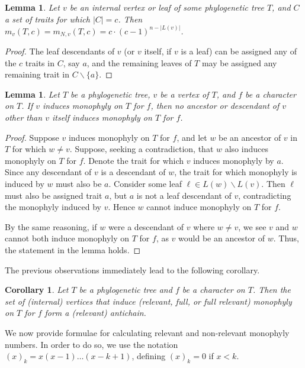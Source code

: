 \documentclass{amsart}
\newtheorem{lemma}[theorem]{Lemma}
\newtheorem{corollary}[theorem]{Corollary}
\theoremstyle{definition}
\begin{document}
\begin{lemma}
\label{l:single.v.count}
    Let $v$ be an internal vertex or leaf of some phylogenetic tree $T$, and $C$ a set of traits for which $|C|=c$. Then $m_v(T,c)= m_{N,v}(T,c) = c \cdot (c-1)^{n-|L(v)|} $.
\end{lemma}

\begin{proof}
    The leaf descendants of $v$ (or $v$ itself, if $v$ is a leaf) can be assigned any of the $c$ traits in $C$, say $a$, and the remaining leaves of $T$ may be assigned any remaining trait in $C \backslash\{a\}$. 
\end{proof}

\begin{lemma}\label{lem_ancdes}
    Let $T$ be a phylogenetic tree, $v$ be a vertex of $T$, and $f$ be a character on $T$. If $v$ induces monophyly on $T$ for $f$, then no ancestor or descendant of $v$ other than $v$ itself induces monophyly on $T$ for $f$.
\end{lemma}

\begin{proof}
    Suppose $v$ induces monophyly on $T$ for $f$, and let $w$ be an ancestor of $v$ in $T$ for which $w \ne v$. Suppose, seeking a contradiction, that $w$ also induces monophyly on $T$ for $f$. Denote the trait for which $v$ induces monophyly by $a$. Since any descendant of $v$ is a descendant of $w$, the trait for which monophyly is induced by $w$ must also be $a$. Consider some leaf $\ell \in L(w) \backslash L(v)$. Then $\ell$ must also be assigned trait $a$, but $a$ is not a leaf descendant of $v$, contradicting the monophyly induced by $v$. Hence $w$ cannot induce monophyly on $T$ for $f$.

    By the same reasoning, if $w$ were a descendant of $v$ where $w \ne v$, we see $v$ and $w$ cannot both induce monophyly on $T$ for $f$, as $v$ would be an ancestor of $w$. Thus, the statement in the lemma holds.
\end{proof}

The previous observations immediately lead to the following corollary.

\begin{corollary}\label{c:antichain}
    Let $T$ be a phylogenetic tree and $f$ be a character on $T$. Then the set of (internal) vertices that induce (relevant, full, or full relevant) monophyly on $T$ for $f$ form a (relevant) antichain. 
\end{corollary}


We now provide formulae for calculating relevant and non-relevant monophyly numbers. In order to do so, we use the notation $(x)_k = x(x-1)\dots(x-k+1)$, defining $(x)_k=0$ if $x<k$.
\end{document}
